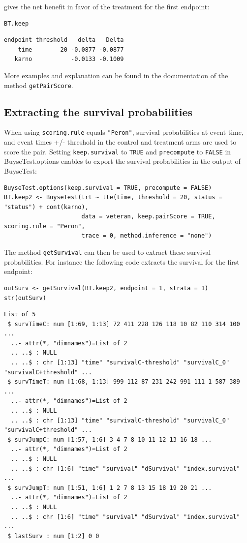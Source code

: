 \documentclass[12pt]{article}
\begin{document}
gives the net benefit in favor of the treatment for the first
endpoint:
\lstset{language=r,label= ,caption= ,captionpos=b,numbers=none}
\begin{lstlisting}
BT.keep
\end{lstlisting}

\begin{verbatim}
endpoint threshold   delta   Delta
    time        20 -0.0877 -0.0877
   karno           -0.0133 -0.1009
\end{verbatim}


More examples and explanation can be found in the documentation of
the method \texttt{getPairScore}.

\subsection{Extracting the survival probabilities}
\label{sec:org2fcb96f}
When using \texttt{scoring.rule} equals \texttt{"Peron"}, survival probabilities at
event time, and event times +/- threshold in the control and treatment
arms are used to score the pair. Setting \texttt{keep.survival} to \texttt{TRUE} and
\texttt{precompute} to \texttt{FALSE} in BuyseTest.options enables to export the
survival probabilities in the output of BuyseTest:
\lstset{language=r,label= ,caption= ,captionpos=b,numbers=none}
\begin{lstlisting}
BuyseTest.options(keep.survival = TRUE, precompute = FALSE)
BT.keep2 <- BuyseTest(trt ~ tte(time, threshold = 20, status = "status") + cont(karno),
                      data = veteran, keep.pairScore = TRUE, scoring.rule = "Peron",
                      trace = 0, method.inference = "none")
\end{lstlisting}

The method \texttt{getSurvival} can then be used to extract these survival
probabilities. For instance the following code extracts the survival
for the first endpoint:
\lstset{language=r,label= ,caption= ,captionpos=b,numbers=none}
\begin{lstlisting}
outSurv <- getSurvival(BT.keep2, endpoint = 1, strata = 1)
str(outSurv)
\end{lstlisting}

\begin{verbatim}
List of 5
 $ survTimeC: num [1:69, 1:13] 72 411 228 126 118 10 82 110 314 100 ...
  ..- attr(*, "dimnames")=List of 2
  .. ..$ : NULL
  .. ..$ : chr [1:13] "time" "survivalC-threshold" "survivalC_0" "survivalC+threshold" ...
 $ survTimeT: num [1:68, 1:13] 999 112 87 231 242 991 111 1 587 389 ...
  ..- attr(*, "dimnames")=List of 2
  .. ..$ : NULL
  .. ..$ : chr [1:13] "time" "survivalC-threshold" "survivalC_0" "survivalC+threshold" ...
 $ survJumpC: num [1:57, 1:6] 3 4 7 8 10 11 12 13 16 18 ...
  ..- attr(*, "dimnames")=List of 2
  .. ..$ : NULL
  .. ..$ : chr [1:6] "time" "survival" "dSurvival" "index.survival" ...
 $ survJumpT: num [1:51, 1:6] 1 2 7 8 13 15 18 19 20 21 ...
  ..- attr(*, "dimnames")=List of 2
  .. ..$ : NULL
  .. ..$ : chr [1:6] "time" "survival" "dSurvival" "index.survival" ...
 $ lastSurv : num [1:2] 0 0
\end{verbatim}
\end{document}
